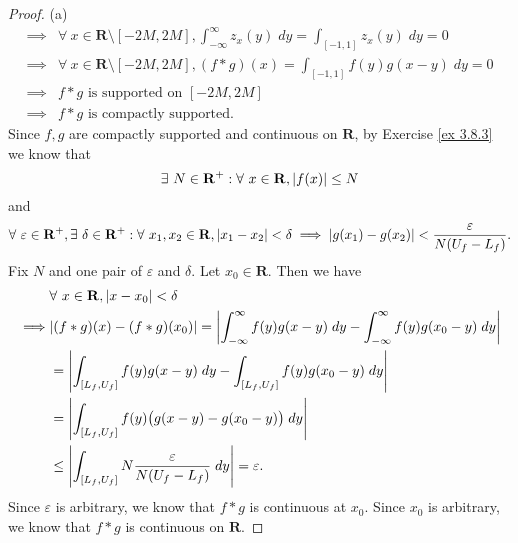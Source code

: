 \begin{proof}{(a)}
\begin{align*}
        \implies & \forall\ x \in \mathbf{R} \setminus [-2M, 2M], \int_{-\infty}^\infty z_x(y) \; dy = \int_{[-1, 1]} z_x(y) \; dy = 0 \\
        \implies & \forall\ x \in \mathbf{R} \setminus [-2M, 2M], (f * g)(x) = \int_{[-1, 1]} f(y) g(x - y) \; dy = 0                  \\
        \implies & f * g \text{ is supported on } [-2M, 2M]                                                                            \\
        \implies & f * g \text{ is compactly supported}.
    \end{align*}
    Since \(f, g\) are compactly supported and continuous on \(\mathbf{R}\), by Exercise \ref{ex 3.8.3} we know that
    \[
        \exists\ N \in \mathbf{R}^+ : \forall\ x \in \mathbf{R}, \abs*{f(x)} \leq N
    \]
    and
    \[
        \forall\ \varepsilon \in \mathbf{R}^+, \exists\ \delta \in \mathbf{R}^+ : \forall\ x_1, x_2 \in \mathbf{R}, \abs*{x_1 - x_2} < \delta \implies \abs*{g(x_1) - g(x_2)} < \frac{\varepsilon}{N (U_f - L_f)}.
    \]
    Fix \(N\) and one pair of \(\varepsilon\) and \(\delta\).
    Let \(x_0 \in \mathbf{R}\).
    Then we have
    \begin{align*}
                 & \forall\ x \in \mathbf{R}, \abs*{x - x_0} < \delta                                                                                \\
        \implies & \abs*{(f * g)(x) - (f * g)(x_0)} = \abs*{\int_{-\infty}^\infty f(y) g(x - y) \; dy - \int_{-\infty}^\infty f(y) g(x_0 - y) \; dy} \\
                 & = \abs*{\int_{[L_f, U_f]} f(y) g(x - y) \; dy - \int_{[L_f, U_f]} f(y) g(x_0 - y) \; dy}                                          \\
                 & = \abs*{\int_{[L_f, U_f]} f(y) \big(g(x - y) - g(x_0 - y)\big) \; dy}                                                             \\
                 & \leq \abs*{\int_{[L_f, U_f]} N \frac{\varepsilon}{N (U_f - L_f)} \; dy} = \varepsilon.
    \end{align*}
    Since \(\varepsilon\) is arbitrary, we know that \(f * g\) is continuous at \(x_0\).
    Since \(x_0\) is arbitrary, we know that \(f * g\) is continuous on \(\mathbf{R}\).
\end{proof}

